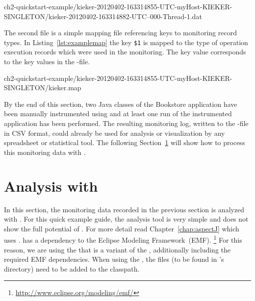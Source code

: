 \setBashListing
%
{ch2-quickstart-example/kieker-20120402-163314855-UTC-myHost-KIEKER-SINGLETON/kieker-20120402-163314882-UTC--000-Thread-1.dat}

\noindent The second file is a simple mapping file referencing keys to monitoring record types. In Listing~\ref{lst:examplemap} the key \verb!$1! is mapped to the type of operation execution records which were used in the monitoring. The key value corresponds to the key values in the -file.

%
{ch2-quickstart-example/kieker-20120402-163314855-UTC-myHost-KIEKER-SINGLETON/kieker.map}

\noindent By the end of this section, two Java classes of the Bookstore application %
have been manually instrumented using \KiekerMonitoringPart{} and at least one %
run of the instrumented application has been performed. %
The resulting monitoring log, written to the -file in CSV format, could %
already be used for analysis or visualization by any spreadsheet or %
statistical tool. %
The following Section~\ref{sec:example:analysis} will show how to process %
this monitoring data with \KiekerAnalysisPart{}. 

\section{Analysis with \KiekerAnalysisPart{}}\label{sec:example:analysis}

In this section, the monitoring data recorded in the previous section is %
analyzed with \KiekerAnalysisPart{}. %
For this quick example guide, the analysis tool is very simple and does not show %
the full potential of \Kieker{}. For more detail read Chapter~\ref{chap:aspectJ} %
which uses \KiekerTraceAnalysis{}. %
\KiekerAnalysisPart{} has a dependency to the Eclipse Modeling Framework~(EMF).%
\footnote{\url{http://www.eclipse.org/modeling/emf/}} %
For this reason, we are using the \file{\mainJarEMF{}} that is a variant of %
the \file{\mainJar{}}, additionally including the required EMF dependencies. %
When using the \file{\mainJar{}}, the  files (to %
be found in \Kieker's  directory) need to be added to the classpath. %

